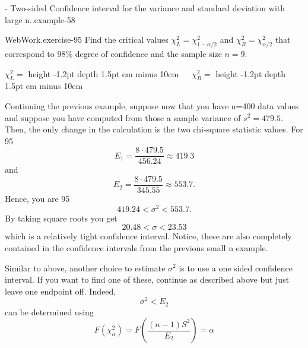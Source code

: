 \documentclass[10pt,]{book}
\newcommand{\fillin}[1]{\leavevmode\leaders\vrule height -1.2pt depth 1.5pt \hskip #1em minus #1em \null}
\numberwithin{equation}{section}
\newcommand{\lt}{<}
\begin{document}
 \begin{example}{- Two-sided Confidence interval for the variance and standard deviation with large n..}{example-58}%
\hypertarget{p-1406}{}%
\begin{inlineexercise}{WebWork.}{exercise-95}%
\hypertarget{p-1407}{}%
Find the critical values \(\chi_L^2 = \chi_{1-\alpha/2}^2\) and \(\chi_R^2 = \chi_{\alpha/2}^2\) that correspond to \(98\)\% degree of confidence and the sample size \(n = 9.\)%
\par
\hypertarget{p-1408}{}%
\(\chi_L^2 =\)  \fillin{10} \(\ \ \ \ \) \(\chi_R^2 =\)  \fillin{10}%
\end{inlineexercise}
%
\par
\hypertarget{p-1409}{}%
Continuing the previous example, suppose now that you have n=400 data values and suppose you have computed from those a sample variance of \(s^2 = 479.5\).  Then, the only change in the calculation is the two chi-square statistic values. For 95%
\begin{equation*}
E_1 = \frac{8 \cdot 479.5}{456.24} \approx 419.3
\end{equation*}
and%
\begin{equation*}
E_2 = \frac{8 \cdot 479.5}{345.55} \approx 553.7.
\end{equation*}
Hence, you are 95%
\begin{equation*}
419.24 \lt \sigma^2 \lt 553.7.
\end{equation*}
By taking square roots you get%
\begin{equation*}
20.48 \lt \sigma \lt 23.53
\end{equation*}
which is a relatively tight confidence interval.  Notice, these are also completely contained in the confidence intervals from the previous small n example.%
\end{example}
%
\par
\hypertarget{p-1410}{}%
Similar to above, another choice to estimate \(\sigma ^2\) is to use a one sided confidence interval. If you want to find one of these, continue as described above but just leave one endpoint off.  Indeed,%
\begin{equation*}
\sigma^2 \lt E_2
\end{equation*}
can be determined using%
\begin{equation*}
F(\chi^2_{\alpha} ) = F \left ( \frac{(n-1)S^2}{E_2} \right ) = \alpha
\end{equation*}
\end{document}
